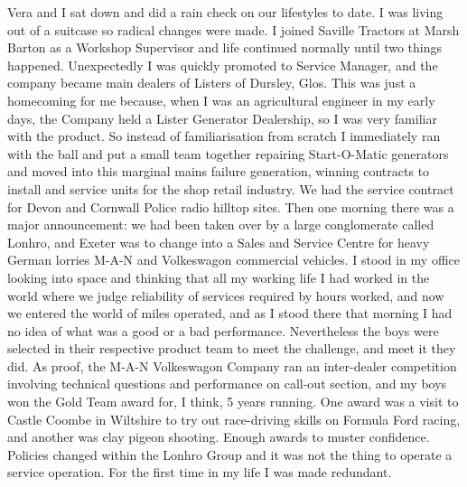 
Vera and I sat down and did a rain check on our lifestyles to date. I was living
out of a suitcase so radical changes were made. I joined Saville Tractors at
Marsh Barton as a Workshop Supervisor and life continued normally until two
things happened. Unexpectedly I was quickly promoted to Service Manager, and
the company became main dealers of Listers of Dursley, Glos. This was just a
homecoming for me because, when I was an agricultural engineer in my early
days, the Company held a Lister Generator Dealership, so I was very familiar
with the product. So instead of familiarisation from scratch I immediately ran
with the ball and put a small team together repairing Start-O-Matic generators
and moved into this marginal mains failure generation, winning contracts to
install and service units for the shop retail industry. We had the service
contract for Devon and Cornwall Police radio hilltop sites. Then one morning
there was a major announcement: we had been taken over by a large conglomerate
called Lonhro, and Exeter was to change into a Sales and Service Centre for
heavy German lorries M-A-N and Volkeswagon commercial vehicles. I stood in my
office looking into space and thinking that all my working life I had worked in
the world where we judge reliability of services required by hours worked, and
now we entered the world of miles operated, and as I stood there that morning I
had no idea of what was a good or a bad performance. Nevertheless the boys were
selected in their respective product team to meet the challenge, and meet it
they did. As proof, the M-A-N Volkeswagon Company ran an inter-dealer
competition involving technical questions and performance on call-out section,
and my boys won the Gold Team award for, I think, 5 years running. One award
was a visit to Castle Coombe in Wiltshire to try out race-driving skills on
Formula Ford racing, and another was clay pigeon shooting. Enough awards to
muster confidence. Policies changed within the Lonhro Group and it was not the
thing to operate a service operation. For the first time in my life I was made
redundant.

